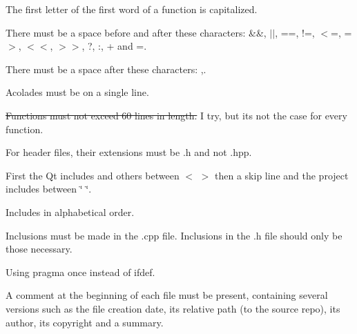\begin{DoxyItemize}
\begin{DoxyItemize}
\begin{DoxyItemize}
\end{DoxyItemize}
\end{DoxyItemize}
\item The first letter of the first word of a function is capitalized.
\item There must be a space before and after these characters\+: \textquotesingle{}\&\&\textquotesingle{}, \textquotesingle{}$\vert$$\vert$\textquotesingle{}, \textquotesingle{}==\textquotesingle{}, \textquotesingle{}!=\textquotesingle{}, \textquotesingle{}$<$=\textquotesingle{}, \textquotesingle{}=$>$\textquotesingle{}, \textquotesingle{}$<$$<$\textquotesingle{}, \textquotesingle{}$>$$>$\textquotesingle{}, \textquotesingle{}?\textquotesingle{}, \textquotesingle{}\+:\textquotesingle{}, \textquotesingle{}+\textquotesingle{} and \textquotesingle{}=\textquotesingle{}.
\item There must be a space after these characters\+: \textquotesingle{},\textquotesingle{}.
\item Acolades must be on a single line.
\item \sout{Functions must not exceed 60 lines in length.} I try, but it\textquotesingle{}s not the case for every function.
\item For header files, their extensions must be .h and not .hpp.
\item First the Qt includes and others between \textquotesingle{}$<$\textquotesingle{} \textquotesingle{}$>$\textquotesingle{} then a skip line and the project includes between \textquotesingle{}\char`\"{}\textquotesingle{} \textquotesingle{}\char`\"{}\textquotesingle{}.
\item Includes in alphabetical order.
\item Inclusions must be made in the .cpp file. Inclusions in the .h file should only be those necessary.
\item Using pragma once instead of ifdef.
\item A comment at the beginning of each file must be present, containing several versions such as the file creation date, its relative path (to the source repo), its author, its copyright and a summary. 
\end{DoxyItemize}